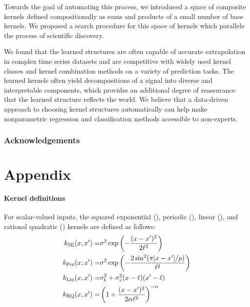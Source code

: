\documentclass[twoside]{article}
\begin{document}
Towards the goal of automating this process, we introduced a space of composite kernels defined compositionally as sums and products of a small number of base kernels.
We proposed a search procedure for this space of kernels which parallels the process of scientific discovery.

We found that the learned structures are often capable of accurate extrapolation in complex time series datasets and are competitive with widely used kernel classes and kernel combination methods on a variety of prediction tasks.
The learned kernels often yield decompositions of a signal into diverse and interpretable components, which provides an additional degree of reassurance that the learned structure reflects the world.
We believe that a data-driven approach to choosing kernel structures automatically can help make nonparametric regression and classification methods accessible to non-experts.

\subsubsection*{Acknowledgements}

\appendix
\section*{Appendix}
\label{appendix}
\paragraph{Kernel definitions}
For scalar-valued inputs, the squared exponential (\kSE), periodic (\kPer), linear (\kLin), and rational quadratic (\kRQ) kernels are defined as follows:
%
\begin{eqnarray*}
k_\textrm{SE}(x, x') =& \sigma^2\exp\left(-\frac{(x - x')^2}{2\ell^2}\right) \\
k_\textrm{Per}(x, x') =& \sigma^2\exp\left(-\frac{2\sin^2(\pi|x - x'|/p)}{\ell^2}\right) \\
k_\textrm{Lin}(x, x') =& \sigma_b^2 + \sigma_v^2(x - \ell)(x' - \ell) \\
k_\textrm{RQ}(x, x') =& \left( 1 + \frac{(x - x')^2}{2 \alpha \ell^2} \right)^{-\alpha}
\end{eqnarray*}
\end{document}
